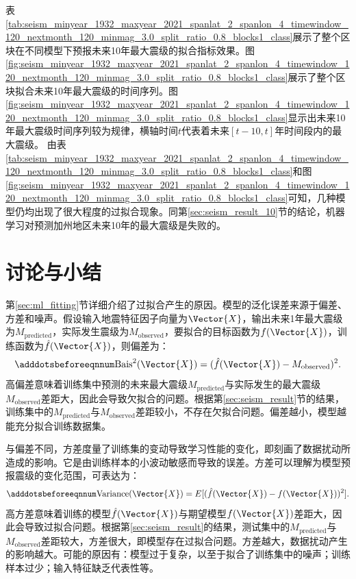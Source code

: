 表\ref{tab:seism_minyear_1932_maxyear_2021_spanlat_2_spanlon_4_timewindow_120_nextmonth_120_minmag_3.0_split_ratio_0.8_blocks1_class}展示了整个区块在不同模型下预报未来10年最大震级的拟合指标效果。图\ref{fig:seism_minyear_1932_maxyear_2021_spanlat_2_spanlon_4_timewindow_120_nextmonth_120_minmag_3.0_split_ratio_0.8_blocks1_class}展示了整个区块拟合未来10年最大震级的时间序列。图\ref{fig:seism_minyear_1932_maxyear_2021_spanlat_2_spanlon_4_timewindow_120_nextmonth_120_minmag_3.0_split_ratio_0.8_blocks1_class}显示出未来10年最大震级时间序列较为规律，横轴时间$t$代表着未来$[t-10,t]$年时间段内的最大震级。
由表\ref{tab:seism_minyear_1932_maxyear_2021_spanlat_2_spanlon_4_timewindow_120_nextmonth_120_minmag_3.0_split_ratio_0.8_blocks1_class}和图\ref{fig:seism_minyear_1932_maxyear_2021_spanlat_2_spanlon_4_timewindow_120_nextmonth_120_minmag_3.0_split_ratio_0.8_blocks1_class}可知，几种模型仍均出现了很大程度的过拟合现象。同第\ref{sec:seism_result_10}节的结论，机器学习对预测加州地区未来10年的最大震级是失败的。

\section{讨论与小结}\label{sec:seism_conclusion}

第\ref{sec:ml_fitting}节详细介绍了过拟合产生的原因。模型的泛化误差来源于偏差、方差和噪声。假设输入地震特征因子向量为$\Vector{X}$，输出未来1年最大震级为$M_{\text{predicted}}$，实际发生震级为$M_{\text{observed}}$，要拟合的目标函数为$f(\Vector{X})$，训练函数为$\hat{f}(\Vector{X})$，则偏差为：
\begin{equation}\adddotsbeforeeqnnum
  \label{eq:seism_bias}
  \text{Bais}^2(\Vector{X})=(\hat{f}(\Vector{X})-M_{\text{observed}})^2.
\end{equation}
高偏差意味着训练集中预测的未来最大震级$M_{\text{predicted}}$与实际发生的最大震级$M_{\text{observed}}$差距大，因此会导致欠拟合的问题。根据第\ref{sec:seism_result}节的结果，训练集中的$M_{\text{predicted}}$与$M_{\text{observed}}$差距较小，不存在欠拟合问题。偏差越小，模型越能充分拟合训练数据集。

与偏差不同，方差度量了训练集的变动导致学习性能的变化，即刻画了数据扰动所造成的影响。它是由训练样本的小波动敏感而导致的误差。方差可以理解为模型预报震级的变化范围，可表达为：
\begin{equation}\adddotsbeforeeqnnum
  \label{eq:seism_variance}
  \text{Variance}(\Vector{X})=E[(\hat{f}(\Vector{X})-f(\Vector{X}))^2].
\end{equation}
高方差意味着训练的模型$\hat{f}(\Vector{X})$与期望模型$f(\Vector{X})$差距大，因此会导致过拟合问题。根据第\ref{sec:seism_result}的结果，测试集中的$M_{\text{predicted}}$与$M_{\text{observed}}$差距较大，方差很大，即模型存在过拟合问题。方差越大，数据扰动产生的影响越大。可能的原因有：模型过于复杂，以至于拟合了训练集中的噪声；训练样本过少；输入特征缺乏代表性等。

